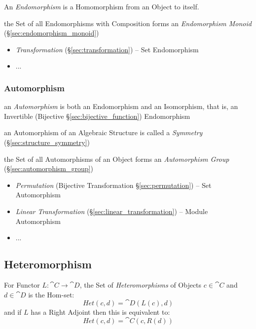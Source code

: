 An \emph{Endomorphism} is a Homomorphism from an Object to itself.

the Set of all Endomorphisms with Composition forms an \emph{Endomorphism
  Monoid} (\S\ref{sec:endomorphism_monoid})

\begin{itemize}
  \item \emph{Transformation} (\S\ref{sec:transformation}) -- Set Endomorphism
  \item ...
\end{itemize}



\subsubsection{Automorphism}\label{sec:automorphism}

an \emph{Automorphism} is both an Endomorphism and an Isomorphism, that is, an
Invertible (Bijective \S\ref{sec:bijective_function}) Endomorphism

an Automorphism of an Algebraic Structure is called a \emph{Symmetry}
(\S\ref{sec:structure_symmetry})

the Set of all Automorphisms of an Object forms an \emph{Automorphism Group}
(\S\ref{sec:automorphism_group})

\begin{itemize}
  \item \emph{Permutation} (Bijective Transformation \S\ref{sec:permutation})
    -- Set Automorphism
  \item \emph{Linear Transformation} (\S\ref{sec:linear_transformation})
    -- Module Automorphism
  \item ...
\end{itemize}



\subsection{Heteromorphism}\label{sec:heteromorphism}

For Functor $L : \cat{C} \rightarrow \cat{D}$, the Set of
\emph{Heteromorphisms} of Objects $c \in \cat{C}$ and $d \in
\cat{D}$ is the Hom-set:
\[
  Het(c,d) = \cat{D}(L(c), d)
\]
and if $L$ has a Right Adjoint then this is equivalent to:
\[
  Het(c,d) = \cat{C}(c, R(d))
\]

